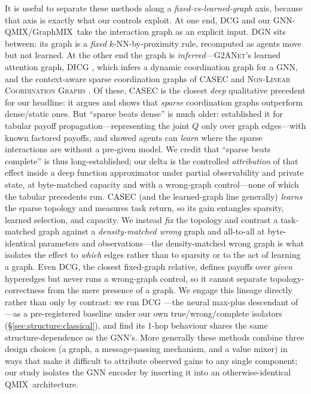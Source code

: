 \documentclass[10pt]{article}
\newcommand{\algoname}[1]{\textsc{#1}}
\newcommand{\qmix}{\algoname{QMIX}}
\newcommand{\gnnqmix}{\algoname{GNN-QMIX}}
\begin{document}
It is useful to separate these methods along a \emph{fixed-vs-learned-graph}
axis, because that axis is exactly what our controls exploit. At one end,
\algoname{DCG} and our \gnnqmix/GraphMIX\ take the interaction graph as an
explicit input. \algoname{DGN} sits between: its graph is a \emph{fixed}
$k$-NN-by-proximity rule, recomputed as agents move but not learned. At the
other end the graph is \emph{inferred}---\algoname{G2ANet}'s learned attention
graph, \algoname{DICG} \citep{li_2021_dicg}, which infers a dynamic
coordination graph for a GNN, and the context-aware sparse coordination graphs
of \algoname{CASEC} \citep{wang_2022_casec} and \algoname{Non-Linear
Coordination Graphs} \citep{kang_2022_nonlinearcg}. Of these, \algoname{CASEC}
is the closest \emph{deep} qualitative precedent for our headline: it argues and
shows that \emph{sparse} coordination graphs outperform dense/static ones. But
``sparse beats dense'' is much older: \citet{kok_2004_sparseq} established it for
tabular payoff propagation---representing the joint $Q$ only over graph
edges---with known factored payoffs, and \citet{melo_2009_sparseinteractions}
showed agents can \emph{learn} where the sparse interactions are without a
pre-given model. We credit that ``sparse beats complete'' is thus
long-established; our delta is the controlled \emph{attribution} of that effect
inside a deep function approximator under partial observability and private
state, at byte-matched capacity and with a wrong-graph control---none of which
the tabular precedents run. CASEC (and the learned-graph line generally) \emph{learns}
the sparse topology and measures task return, so its gain entangles sparsity,
learned selection, and capacity. We instead \emph{fix} the topology and contrast
a task-matched graph against a \emph{density-matched wrong} graph and all-to-all
at byte-identical parameters and observations---the density-matched wrong graph
is what isolates the effect to \emph{which} edges rather than to sparsity or to
the act of learning a graph. Even \algoname{DCG}, the closest fixed-graph
relative, defines payoffs over \emph{given} hyperedges but never runs a
wrong-graph control, so it cannot separate topology-correctness from the mere
presence of a graph. We engage this lineage directly rather than only by
contrast: we run \algoname{DCG} \citep{boehmer_2020_dcg}---the neural max-plus
descendant of \citet{kok_2006_payoffprop}---as a pre-registered baseline under
our own true/wrong/complete isolators (\S\ref{sec:structure:classical}), and
find its 1-hop behaviour shares the same structure-dependence as the GNN's.
More generally these methods combine three design choices
(a graph, a message-passing mechanism, and a value mixer) in ways that make it
difficult to attribute observed gains to any single component; our study
isolates the GNN encoder by inserting it into an otherwise-identical \qmix\
architecture.
\end{document}
